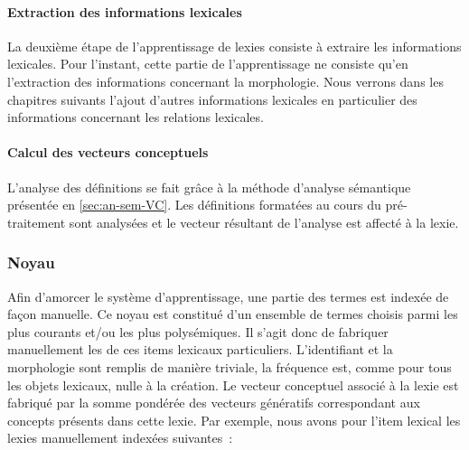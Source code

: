 \paragraph{Extraction des informations lexicales}

La deuxième étape de l'apprentissage de lexies consiste à extraire les
informations lexicales. Pour l'instant, cette partie de
l'apprentissage ne consiste qu'en l'extraction des informations
concernant la morphologie. Nous verrons dans les chapitres suivants
l'ajout d'autres informations lexicales en particulier des
informations concernant les relations lexicales.

\paragraph{Calcul des vecteurs conceptuels}

L'analyse des définitions se fait grâce à la méthode d'analyse
sémantique présentée en \ref{sec:an-sem-VC}. Les définitions formatées
au cours du pré-traitement sont analysées et le vecteur résultant de
l'analyse est affecté à la lexie.

\subsubsection{Noyau} \label{sec:noyau}

Afin d'amorcer le système d'apprentissage, une partie des termes est
indexée de façon manuelle. Ce noyau est constitué d'un ensemble de
termes choisis parmi les plus courants et/ou les plus polysémiques.
Il s'agit donc de fabriquer manuellement les  de ces
items lexicaux particuliers. L'identifiant et la morphologie sont
remplis de manière triviale, la fréquence est, comme pour tous les
objets lexicaux, nulle à la création. Le vecteur conceptuel associé à
la lexie est fabriqué par la somme pondérée des vecteurs génératifs
 correspondant aux concepts présents dans
cette lexie. Par exemple, nous avons pour l'item lexical
 les lexies manuellement indexées suivantes~:


